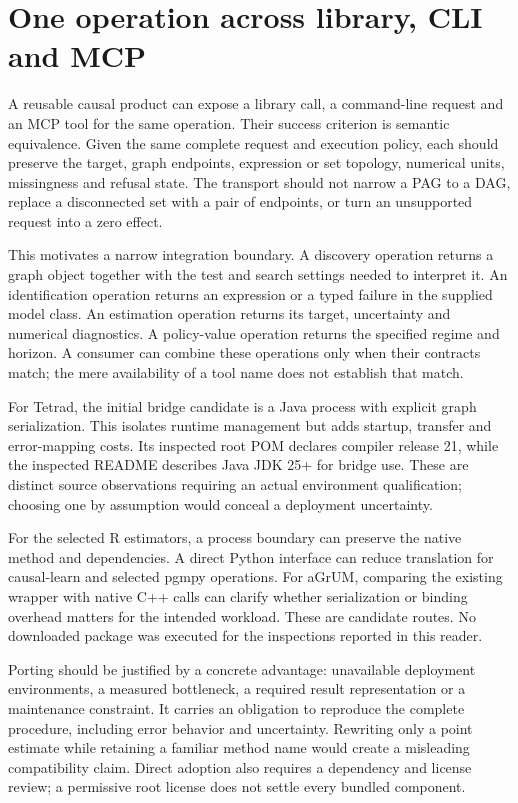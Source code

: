 \section{One operation across library, CLI and MCP}

A reusable causal product can expose a library call, a command-line request
and an MCP tool for the same operation. Their success criterion is semantic
equivalence. Given the same complete request and execution policy, each should
preserve the target, graph endpoints, expression or set topology, numerical
units, missingness and refusal state. The transport should not narrow a PAG
to a DAG, replace a disconnected set with a pair of endpoints, or turn an
unsupported request into a zero effect.

This motivates a narrow integration boundary. A discovery operation returns
a graph object together with the test and search settings needed to interpret
it. An identification operation returns an expression or a typed failure in
the supplied model class. An estimation operation returns its target,
uncertainty and numerical diagnostics. A policy-value operation returns the
specified regime and horizon. A consumer can combine these operations only
when their contracts match; the mere availability of a tool name does not
establish that match.

For Tetrad, the initial bridge candidate is a Java process with explicit graph
serialization. This isolates runtime management but adds startup, transfer
and error-mapping costs. Its inspected root POM declares compiler release 21,
while the inspected README describes Java JDK 25+ for bridge use. These are
distinct source observations requiring an actual environment qualification;
choosing one by assumption would conceal a deployment uncertainty.
\cite{tetrad}

For the selected R estimators, a process boundary can preserve the native
method and dependencies. A direct Python interface can reduce translation
for causal-learn and selected pgmpy operations. For aGrUM, comparing the
existing wrapper with native C++ calls can clarify whether serialization or
binding overhead matters for the intended workload. These are candidate
routes. No downloaded package was executed for the inspections reported in
this reader.

Porting should be justified by a concrete advantage: unavailable deployment
environments, a measured bottleneck, a required result representation or a
maintenance constraint. It carries an obligation to reproduce the complete
procedure, including error behavior and uncertainty. Rewriting only a point
estimate while retaining a familiar method name would create a misleading
compatibility claim. Direct adoption also requires a dependency and license
review; a permissive root license does not settle every bundled component.


